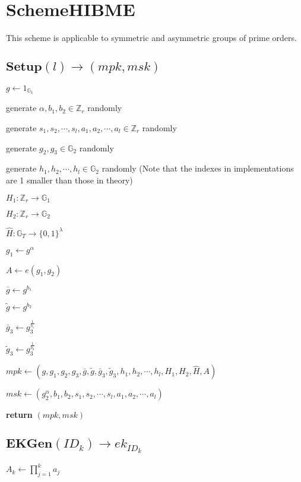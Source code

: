 \documentclass[a4paper]{article}
\begin{document}
\section{SchemeHIBME}

This scheme is applicable to symmetric and asymmetric groups of prime orders. 

\subsection{$\textbf{Setup}(l) \rightarrow (\textit{mpk}, \textit{msk})$}

$g \gets 1_{\mathbb{G}_1}$

generate $\alpha, b_1, b_2 \in \mathbb{Z}_r$ randomly

generate $s_1, s_2, \cdots, s_l, a_1, a_2, \cdots, a_l \in \mathbb{Z}_r$ randomly

generate $g_2, g_3 \in \mathbb{G}_2$ randomly

generate $h_1, h_2, \cdots, h_l \in \mathbb{G}_2$ randomly (Note that the indexes in implementations are 1 smaller than those in theory)

$H_1:\mathbb{Z}_r \rightarrow \mathbb{G}_1$

$H_2:\mathbb{Z}_r \rightarrow \mathbb{G}_2$

$\hat{H}: \mathbb{G}_T \rightarrow \{0, 1\}^\lambda$

$g_1 \gets g^\alpha$

$A \gets e(g_1, g_2)$

$\bar{g} \gets g^{b_1}$

$\tilde{g} \gets g^{b_2}$

$\bar{g}_3 \gets g_3^{\frac{1}{b_1}}$

$\tilde{g}_3 \gets g_3^{\frac{1}{b_2}}$

$\textit{mpk} \gets (g, g_1, g_2, g_3, \bar{g}, \tilde{g}, \bar{g}_3, \tilde{g}_3, h_1, h_2, \cdots, h_l, H_1, H_2, \hat{H}, A)$

$\textit{msk} \gets (g_2^\alpha, b_1, b_2, s_1, s_2, \cdots, s_l, a_1, a_2, \cdots, a_l)$

\textbf{return} $(\textit{mpk}, \textit{msk})$

\subsection{$\textbf{EKGen}(\textit{ID}_k) \rightarrow \textit{ek}_{\textit{ID}_k}$}

$A_k \gets \prod\limits_{j = 1}^k a_j$
\end{document}
